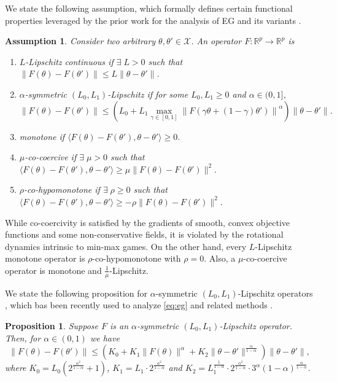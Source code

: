 \documentclass[letter,11pt]{article}
\newtheorem{assumption}[]{Assumption}
\newtheorem{proposition}{Proposition}[]
\begin{document}
We state the following assumption, which formally defines certain functional properties leveraged by the prior work for the analysis of EG and its variants \cite{combettes2004proximal,bauschke2020generalized,chen2023generalized,vankov2024adaptive,tran2023sublinear}.

\begin{assumption}\label{ass:func}
Consider two arbitrary $\theta, \theta' \in \mathcal{X}$. An operator $F: \mathbb{R}^p \to \mathbb{R}^p$ is
\begin{enumerate}[leftmargin=*]
 \item $L$-Lipschitz continuous if $\exists\; L > 0$ such that $\|F(\theta) - F(\theta')\| \le L \|\theta - \theta'\|$.
 \item $\alpha$-symmetric $(L_0, L_1)$-Lipschitz if for some $L_0, L_1 \geq 0$ and $\alpha \in (0, 1]$,
 \begin{equation}
  \| F(\theta) - F(\theta')\| \leq \left( L_0 + L_1 \max_{\gamma \in [0, 1]} \left\|F(\gamma \theta + ( 1- \gamma) \theta') \right\|^{\alpha} \right) \| \theta- \theta'\|.
 \end{equation}
\item monotone if $\langle F(\theta) - F(\theta'), \theta - \theta' \rangle \ge 0.$
\item $\mu$-co-coercive if $\exists \; \mu > 0$ such that $\langle F(\theta) - F(\theta'), \theta - \theta' \rangle \ge \mu \|F(\theta) - F(\theta')\|^2.$
\item $\rho$-co-hypomonotone if $\exists \;\rho \geq 0$ such that $\langle F(\theta) - F(\theta'), \theta - \theta' \rangle \ge -\rho \|F(\theta) - F(\theta')\|^2.$
\end{enumerate}
\end{assumption}
While co-coercivity is satisfied by the gradients of smooth, convex objective functions and some non-conservative fields, it is violated by the rotational dynamics intrinsic to min-max games. On the other hand,
every $L$-Lipschitz monotone operator is $\rho$-co-hypomonotone with $\rho = 0$. Also, a $\mu$-co-coercive operator is monotone and $\frac{1}{\mu}$-Lipschitz.

We state the following proposition for $\alpha$-symmetric $(L_0, L_1)$-Lipschitz operators \cite{chen2023generalized}, which bas been recently used to analyze \eqref{eq:eg} and related methods \cite{vankov2024adaptive,pmlr-v235-vankov24a,choudhuryextragradient}.
\begin{proposition} \label{prop:equiv_formulation}
 Suppose $F$ is an $\alpha$-symmetric $(L_0, L_1)$-Lipschitz operator. Then, for $\alpha \in (0, 1)$ we have
 \begin{equation}\label{eq:alpha(0,1)}
 \textstyle
  \| F(\theta) - F(\theta') \| \leq \left(K_0 + K_1 \|F(\theta)\|^{\alpha} + K_2 \|\theta - \theta'\|^{\frac{\alpha}{1 - \alpha}} \right) \|\theta - \theta'\|,
 \end{equation}
 where $K_0 = L_0 (2^{\frac{\alpha^2}{1 - \alpha}} + 1)$, $K_1 = L_1 \cdot 2^{\frac{\alpha^2}{1 - \alpha}}$ and $K_2 = L_1^{\frac{1}{1 - \alpha}} \cdot 2^{\frac{\alpha^2}{1 - \alpha}} \cdot 3^{\alpha} (1 - \alpha)^{\frac{\alpha}{1 - \alpha}}$.
\end{proposition}
\end{document}
